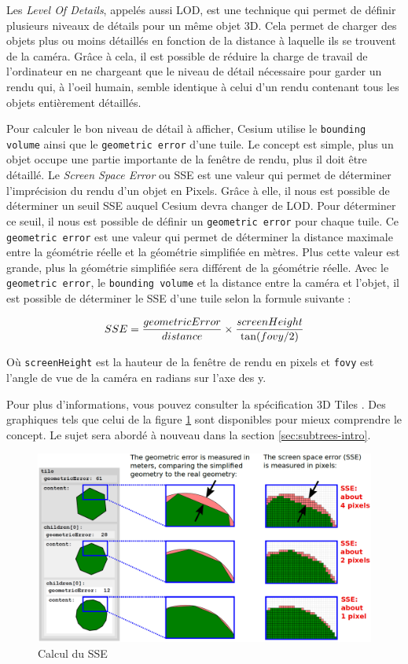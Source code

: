Les \textit{Level Of Details}, appelés aussi LOD, est une technique qui permet de définir plusieurs niveaux de détails pour un même objet 3D. Cela permet de charger des objets plus ou moins détaillés en fonction de la distance à laquelle ils se trouvent de la caméra. Grâce à cela, il est possible de réduire la charge de travail de l'ordinateur en ne chargeant que le niveau de détail nécessaire pour garder un rendu qui, à l'oeil humain, semble identique à celui d'un rendu contenant tous les objets entièrement détaillés.

Pour calculer le bon niveau de détail à afficher, Cesium utilise le \texttt{bounding volume} ainsi que le \texttt{geometric error} d'une tuile. Le concept est simple, plus un objet occupe une partie importante de la fenêtre de rendu, plus il doit être détaillé. Le \textit{Screen Space Error} ou SSE est une valeur qui permet de déterminer l'imprécision du rendu d'un objet en Pixels. Grâce à elle, il nous est possible de déterminer un seuil SSE auquel Cesium devra changer de LOD. Pour déterminer ce seuil, il nous est possible de définir un \texttt{geometric error} pour chaque tuile. Ce \texttt{geometric error} est une valeur qui permet de déterminer la distance maximale entre la géométrie réelle et la géométrie simplifiée en mètres. Plus cette valeur est grande, plus la géométrie simplifiée sera différent de la géométrie réelle. Avec le \texttt{geometric error}, le \texttt{bounding volume} et la distance entre la caméra et l'objet, il est possible de déterminer le SSE d'une tuile selon la formule suivante :

\begin{equation}
    \centering
    SSE = \frac{geometricError}{distance} \times \frac{screenHeight}{\tan(fovy/2)}
\end{equation}

Où \texttt{screenHeight} est la hauteur de la fenêtre de rendu en pixels et \texttt{fovy} est l'angle de vue de la caméra en radians sur l'axe des y.

Pour plus d'informations, vous pouvez consulter la spécification 3D Tiles \cite{3d-tiles-specification}. Des graphiques tels que celui de la figure \ref{fig:sse} sont disponibles pour mieux comprendre le concept. Le sujet sera abordé à nouveau dans la section \ref{sec:subtrees-intro}.

\begin{figure}[H]
    \centering
    \includegraphics[width=1\textwidth]{assets/figures/sse.png}
    \caption{Calcul du SSE \cite{3d-tiles-specification}}
    \label{fig:sse}
\end{figure}